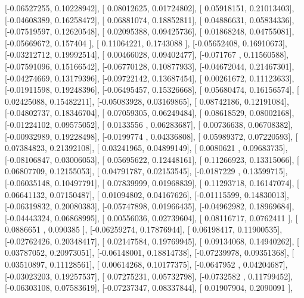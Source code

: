\documentclass{article}
\begin{document}
       [-0.06527255,  0.10228942],
       [ 0.08012625,  0.01724802],
       [ 0.05918151,  0.21013403],
       [-0.04608389,  0.16258472],
       [ 0.06881074,  0.18852811],
       [ 0.04886631,  0.05834336],
       [-0.07519597,  0.12620548],
       [ 0.02095388,  0.09425736],
       [ 0.01868248,  0.04755081],
       [-0.05669672,  0.157404  ],
       [ 0.11064221,  0.1743088 ],
       [-0.05652408,  0.16910673],
       [-0.03212712,  0.19992514],
       [ 0.00466028,  0.09402477],
       [-0.071767  ,  0.11560588],
       [-0.07591096,  0.15166542],
       [-0.06770128,  0.10877933],
       [-0.04672044,  0.21467301],
       [-0.04274669,  0.13179396],
       [-0.09722142,  0.13687454],
       [ 0.00261672,  0.11123633],
       [-0.01911598,  0.19248396],
       [-0.06495457,  0.15326668],
       [ 0.05680474,  0.16156574],
       [ 0.02425088,  0.15482211],
       [-0.05083928,  0.03169865],
       [ 0.08742186,  0.12191084],
       [-0.04802737,  0.18346704],
       [ 0.07059305,  0.06249484],
       [ 0.08618529,  0.08002168],
       [-0.01224102,  0.09575052],
       [ 0.0133556 ,  0.06283687],
       [ 0.00736638,  0.06708382],
       [-0.00932989,  0.19228498],
       [-0.0199774 ,  0.04336808],
       [ 0.05989372,  0.07220593],
       [ 0.07384823,  0.21392108],
       [ 0.03241965,  0.04899149],
       [ 0.0080621 ,  0.09683735],
       [-0.08106847,  0.03006053],
       [ 0.05695622,  0.12448161],
       [ 0.11266923,  0.13315066],
       [ 0.06807709,  0.12155053],
       [ 0.04791787,  0.02153545],
       [-0.0187229 ,  0.13599715],
       [-0.06035148,  0.10497791],
       [ 0.07839999,  0.01968839],
       [ 0.11293718,  0.16147074],
       [ 0.06641132,  0.07150487],
       [ 0.01094802,  0.04167626],
       [-0.01115599,  0.14830013],
       [-0.06319832,  0.20080383],
       [-0.05747898,  0.01966435],
       [-0.04962982,  0.18969684],
       [-0.04443324,  0.06868995],
       [ 0.00556036,  0.02739604],
       [ 0.08116717,  0.0762411 ],
       [ 0.0886651 ,  0.090385  ],
       [-0.06259274,  0.17876944],
       [ 0.06198417,  0.11900535],
       [-0.02762426,  0.20348417],
       [ 0.02147584,  0.19769945],
       [ 0.09134068,  0.14940262],
       [ 0.03787052,  0.20973051],
       [-0.06148001,  0.18814738],
       [-0.07239978,  0.09351368],
       [ 0.03510897,  0.11128561],
       [ 0.00614268,  0.10177375],
       [-0.0647952 ,  0.04204687],
       [-0.03023203,  0.19257537],
       [ 0.07275231,  0.05732798],
       [-0.0732582 ,  0.11799452],
       [-0.06303108,  0.07583619],
       [-0.07237347,  0.08337844],
       [ 0.01907904,  0.2090091 ],
\end{document}
